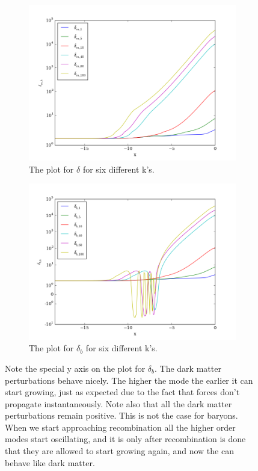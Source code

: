 \documentclass[a4paper]{report}
\begin{document}
\begin{figure}
\begin{subfigure}{.5\textwidth}
  \includegraphics[width=\textwidth]{delta.png}
 \caption{The plot for $\delta$ for six different k's.}
 \label{fig:delta}
\end{subfigure}
\begin{subfigure}{.5\textwidth}
\includegraphics[width=\textwidth]{deltab.png}
 \caption{The plot for $\delta_b$ for six different k's.}
 \label{fig:deltab}
\end{subfigure}
\caption{Note the special y axis on the plot for $\delta_b$. The dark matter perturbations behave nicely. The higher the mode the earlier it can start growing, just as expected due to the fact that forces don't propagate instantaneously. Note also that all the dark matter perturbations remain positive. This is not the case for baryons. When we start approaching recombination all the higher order modes start oscillating, and it is only after recombination is done that they are allowed to start growing again, and now the can behave like dark matter.}
\end{figure}
\end{document}
